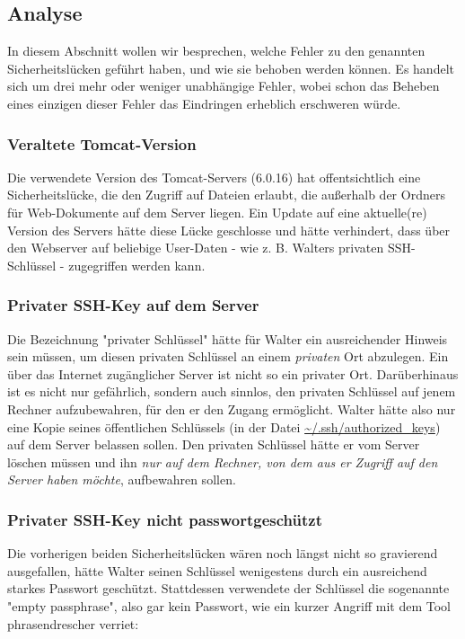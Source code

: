 \subsection{Analyse}
In diesem Abschnitt wollen wir besprechen, welche Fehler zu den genannten Sicherheitslücken geführt haben, und wie sie behoben werden können. Es handelt sich um drei mehr oder weniger unabhängige Fehler, wobei schon das Beheben eines einzigen dieser Fehler das Eindringen erheblich erschweren würde.

\subsubsection{Veraltete Tomcat-Version}
Die verwendete Version des Tomcat-Servers (6.0.16) hat offentsichtlich eine Sicherheitslücke, die den Zugriff auf Dateien erlaubt, die außerhalb der Ordners für Web-Dokumente auf dem Server liegen. Ein Update auf eine aktuelle(re) Version des Servers hätte diese Lücke geschlosse und hätte verhindert, dass über den Webserver auf beliebige User-Daten - wie z. B. Walters privaten SSH-Schlüssel - zugegriffen werden kann.

\subsubsection{Privater SSH-Key auf dem Server}
Die Bezeichnung "privater Schlüssel" hätte für Walter ein ausreichender Hinweis sein müssen, um diesen privaten Schlüssel an einem \emph{privaten} Ort abzulegen. Ein über das Internet zugänglicher Server ist nicht so ein privater Ort. Darüberhinaus ist es nicht nur gefährlich, sondern auch sinnlos, den privaten Schlüssel auf jenem Rechner aufzubewahren, für den er den Zugang ermöglicht.
Walter hätte also nur eine Kopie seines öffentlichen Schlüssels (in der Datei \url{~/.ssh/authorized_keys}) auf dem Server belassen sollen. Den privaten Schlüssel hätte er vom Server löschen müssen und ihn \emph{nur auf dem Rechner, von dem aus er Zugriff auf den Server haben möchte}, aufbewahren sollen.

\subsubsection{Privater SSH-Key nicht passwortgeschützt}
Die vorherigen beiden Sicherheitslücken wären noch längst nicht so gravierend ausgefallen, hätte Walter seinen Schlüssel wenigestens durch ein ausreichend starkes Passwort geschützt. Stattdessen verwendete der Schlüssel die sogenannte "empty passphrase", also gar kein Passwort, wie ein kurzer Angriff mit dem Tool phrasendrescher verriet:

